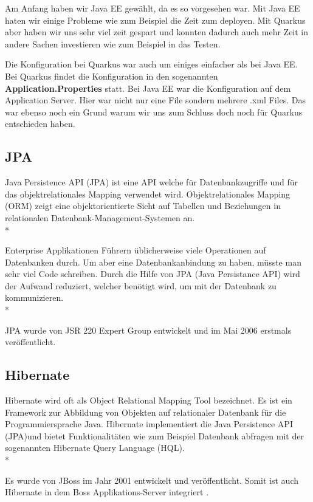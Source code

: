 Am Anfang haben wir Java EE gewählt, da es so vorgesehen war. Mit Java EE haten wir einige Probleme wie zum Beispiel die Zeit zum deployen. 
Mit Quarkus aber haben wir uns sehr viel zeit gespart und konnten dadurch auch mehr Zeit in andere Sachen investieren wie zum Beispiel in das Testen.

Die Konfiguration bei Quarkus war auch um einiges einfacher als bei Java EE. Bei Quarkus findet die Konfiguration in den sogenannten \textbf{Application.Properties} statt.
Bei Java EE war die Konfiguration auf dem Application Server. Hier war nicht nur eine File sondern mehrere .xml Files. Das war ebenso noch ein Grund warum wir uns 
zum Schluss doch noch für Quarkus entschieden haben.


\subsection{JPA}
\author{David Ignjatovic} 

Java Persistence API (JPA) ist eine API welche für Datenbankzugriffe und für das objektrelationales Mapping verwendet wird. 
Objektrelationales Mapping (ORM) zeigt eine objektorientierte Sicht auf Tabellen und Beziehungen in relationalen Datenbank-Management-Systemen an.  \\*

Enterprise Applikationen Führern üblicherweise viele Operationen auf Datenbanken durch.
Um aber eine Datenbankanbindung zu haben, müsste man sehr viel Code schreiben.
Durch die Hilfe von JPA (Java Persistance API) wird der Aufwand reduziert, welcher benötigt wird, um mit der Datenbank zu kommunizieren. \\* \cite{JPA}

JPA wurde von JSR 220 Expert Group entwickelt und im Mai 2006 erstmals veröffentlicht.


\subsection{Hibernate}
\author{David Ignjatovic}

Hibernate wird oft als Object Relational Mapping Tool bezeichnet. Es ist ein Framework zur Abbildung von Objekten auf relationaler Datenbank für die Programmiersprache Java.
Hibernate implementiert die Java Persistence API (JPA)und bietet Funktionalitäten wie zum Beispiel Datenbank abfragen mit der sogenannten Hibernate Query Language (HQL). \\*

Es wurde von JBoss im Jahr 2001 entwickelt und veröffentlicht. Somit ist auch Hibernate in dem Boss Applikations-Server integriert .\cite{Hibernate}

